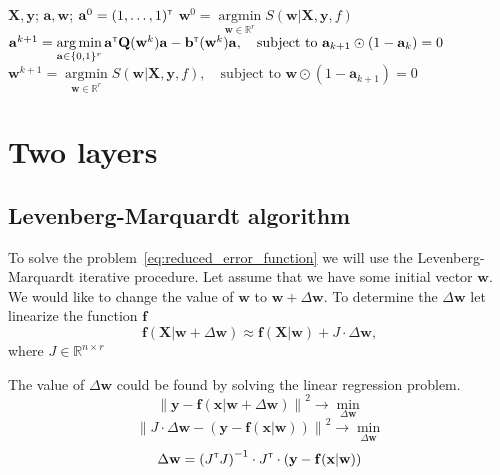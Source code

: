 \documentclass[a4paper,12pt]{article}
\theoremstyle{plain} %
\theoremstyle{definition} %
\theoremstyle{remark} %
\newcommand{\ba}{\mathbf{a}}
\newcommand{\bb}{\mathbf{b}}
\newcommand{\bw}{\mathbf{w}}
\newcommand{\bQ}{\mathbf{Q}}
\newcommand{\by}{\mathbf{y}}
\newcommand{\bx}{\mathbf{x}}
\newcommand{\bX}{\mathbf{X}}
\newcommand{\bbR}{\mathbb{R}}
\newcommand{\T}{{\text{\tiny\sffamily\upshape\mdseries T}}}
\newcommand{\argmin}{\mathop{\arg \min}\limits}
\begin{document}
	\begin{algorithm}[h]
		\caption{}
		\begin{algorithmic}[1]
			\REQUIRE $\bX, \by$;
			\ENSURE $\ba, \bw$;
			\STATE $\ba^0 = (1, \dots, 1)^{\T}$
			\STATE $\bw^0 = \argmin_{\bw \in \bbR^r} S(\bw | \bX, \by, f)$
			\STATE $\ba^{k+1} = \argmin_{\ba \in \{0,1\}^r} \ba^{\T} \bQ(\bw^k) \ba - \bb^{\T}(\bw^k) \ba, \quad \text{subject to } \ba_{k+1} \odot (1 - \ba_k) = 0$
			\STATE $\bw^{k+1} = \argmin_{\bw \in \bbR^r} S(\bw | \bX, \by, f), \quad \text{subject to } \bw \odot (1 - \ba_{k + 1}) = 0$
			\ENDFOR
		\end{algorithmic}
	\end{algorithm}

	\section*{Two layers}
	

	\hrulefill
	
	\subsection{Levenberg-Marquardt algorithm}
	To solve the problem~\ref{eq:reduced_error_function} we will use the Levenberg-Marquardt iterative procedure. 
	Let assume that we have some initial vector $\bw$. 
	We would like to change the value of $\bw$ to $\bw + \Delta \bw$. 
	To determine the $\Delta \bw$ let linearize the function $\mathbf{f}$
	\begin{equation}
		\mathbf{f} (\bX | \bw + \Delta \bw) \approx \mathbf{f}(\bX | \bw) + J \cdot \Delta \bw,
	\end{equation}
	where $J \in \bbR^{n \times r}$
	
	The value of $\Delta \bw$ could be found by solving the linear regression problem.
	\begin{equation}
		\left\| \by - \mathbf{f} (\bx | \bw + \Delta \bw) \right\| ^2 \rightarrow \min_{\Delta \bw}
	\end{equation}
	\begin{equation}
		\left\| J \cdot \Delta \bw - \left( \by - \mathbf{f} (\bx | \bw) \right) \right\|^2 \rightarrow \min_{\Delta \bw}
	\end{equation}
	\begin{equation}
		\Delta \bw = \left( J^{\T} J \right)^{-1} \cdot J^{\T} \cdot \left( \by - \mathbf{f} (\bx | \bw) \right)
	\end{equation}
\end{document}
